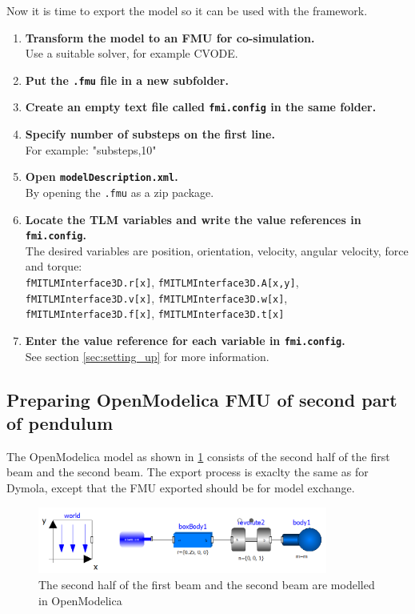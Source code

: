 \documentclass[a4paper,12pt]{include/opencpsreport}
\begin{document}
Now it is time to export the model so it can be used with the framework.
\begin{enumerate}
\item \textbf{Transform the model to an FMU for co-simulation.}\\
      Use a suitable solver, for example CVODE.
\item \textbf{Put the \texttt{.fmu} file in a new subfolder.}
\item \textbf{Create an empty text file called \texttt{fmi.config} in the same folder.}
\item \textbf{Specify number of substeps on the first line.}\\
              For example: "substeps,10"
\item \textbf{Open \texttt{modelDescription.xml}.}\\
              By opening the \texttt{.fmu} as a zip package.
\item \textbf{Locate the TLM variables and write the value references in \texttt{fmi.config}.}\\
              The desired variables are position, orientation, velocity, angular velocity, force and torque:\\
              \texttt{fMITLMInterface3D.r[x]}, \texttt{fMITLMInterface3D.A[x,y]},\\
              \texttt{fMITLMInterface3D.v[x]}, \texttt{fMITLMInterface3D.w[x]},\\
              \texttt{fMITLMInterface3D.f[x]}, \texttt{fMITLMInterface3D.t[x]}
\item \textbf{Enter the value reference for each variable in \texttt{fmi.config}.}\\
              See section \cref{sec:setting_up} for more information.              
\end{enumerate}

\subsection{Preparing OpenModelica FMU of second part of pendulum}
\FloatBarrier
The OpenModelica model as shown in \cref{fig:model_omedit} consists of the second half of the first beam and the second beam.
The export process is exaclty the same as for Dymola, except that the FMU exported should be for model exchange.

\begin{figure}[ht]
\centering
\includegraphics[width=0.85\textwidth]{gfx/model_omedit.png}
\caption{The second half of the first beam and the second beam  are modelled in OpenModelica}
\label{fig:model_omedit}
\end{figure}
\end{document}
